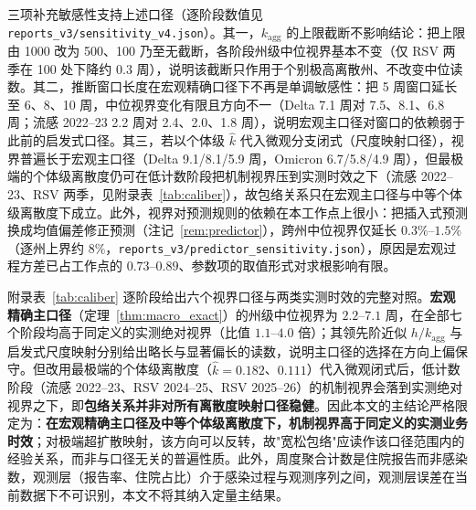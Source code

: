 \documentclass[11pt,a4paper]{article}
\theoremstyle{plain}
\theoremstyle{definition}
\begin{document}
三项补充敏感性支持上述口径（逐阶段数值见 \texttt{reports\_v3/sensitivity\_v4.json}）。其一，$k_{\text{agg}}$ 的上限截断不影响结论：把上限由 1000 改为 500、100 乃至无截断，各阶段州级中位视界基本不变（仅 RSV 两季在 100 处下降约 0.3 周），说明该截断只作用于个别极高离散州、不改变中位读数。其二，推断窗口长度在宏观精确口径下不再是单调敏感性：把 5 周窗口延长至 6、8、10 周，中位视界变化有限且方向不一（Delta 7.1 周对 7.5、8.1、6.8 周；流感 2022--23 2.2 周对 2.4、2.0、1.8 周），说明宏观主口径对窗口的依赖弱于此前的启发式口径。其三，若以个体级 $\hat k$ 代入微观分支闭式（尺度映射口径），视界普遍长于宏观主口径（Delta 9.1/8.1/5.9 周，Omicron 6.7/5.8/4.9 周），但最极端的个体级离散度仍可在低计数阶段把机制视界压到实测时效之下（流感 2022--23、RSV 两季，见附录表~\ref{tab:caliber}），故包络关系只在宏观主口径与中等个体级离散度下成立。此外，视界对预测规则的依赖在本工作点上很小：把插入式预测换成均值偏差修正预测（注记~\ref{rem:predictor}），跨州中位视界仅延长 $0.3\%$--$1.5\%$（逐州上界约 $8\%$，\texttt{reports\_v3/predictor\_sensitivity.json}），原因是宏观过程方差已占工作点的 $0.73$--$0.89$、参数项的取值形式对求根影响有限。

附录表~\ref{tab:caliber} 逐阶段给出六个视界口径与两类实测时效的完整对照。\textbf{宏观精确主口径}（定理~\ref{thm:macro_exact}）的州级中位视界为 $2.2$--$7.1$ 周，在全部七个阶段均高于同定义的实测绝对视界（比值 $1.1$--$4.0$ 倍）；其领先阶近似 $h/k_{\text{agg}}$ 与启发式尺度映射分别给出略长与显著偏长的读数，说明主口径的选择在方向上偏保守。但改用最极端的个体级离散度（$\hat k = 0.182$、$0.111$）代入微观闭式后，低计数阶段（流感 2022--23、RSV 2024--25、RSV 2025--26）的机制视界会落到实测绝对视界之下，即\textbf{包络关系并非对所有离散度映射口径稳健}。因此本文的主结论严格限定为：\textbf{在宏观精确主口径及中等个体级离散度下，机制视界高于同定义的实测业务时效}；对极端超扩散映射，该方向可以反转，故"宽松包络"应读作该口径范围内的经验关系，而非与口径无关的普遍性质。此外，周度聚合计数是住院报告而非感染数，观测层（报告率、住院占比）介于感染过程与观测序列之间，观测层误差在当前数据下不可识别，本文不将其纳入定量主结果。

\end{document}

